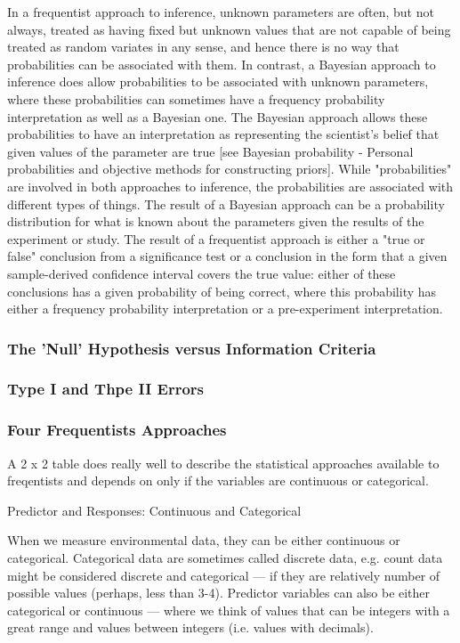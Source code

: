 \documentclass{article}\usepackage[]{graphicx}\usepackage[]{color}
\begin{document}
In a frequentist approach to inference, unknown parameters are often, but not always, treated as having fixed but unknown values that are not capable of being treated as random variates in any sense, and hence there is no way that probabilities can be associated with them. In contrast, a Bayesian approach to inference does allow probabilities to be associated with unknown parameters, where these probabilities can sometimes have a frequency probability interpretation as well as a Bayesian one. The Bayesian approach allows these probabilities to have an interpretation as representing the scientist's belief that given values of the parameter are true [see Bayesian probability - Personal probabilities and objective methods for constructing priors].
While "probabilities" are involved in both approaches to inference, the probabilities are associated with different types of things. The result of a Bayesian approach can be a probability distribution for what is known about the parameters given the results of the experiment or study. The result of a frequentist approach is either a "true or false" conclusion from a significance test or a conclusion in the form that a given sample-derived confidence interval covers the true value: either of these conclusions has a given probability of being correct, where this probability has either a frequency probability interpretation or a pre-experiment interpretation.

\subsubsection{The 'Null' Hypothesis versus Information Criteria}


\subsubsection{Type I and Thpe II Errors}


\subsubsection{Four Frequentists Approaches}

A 2 x 2 table does really well to describe the statistical approaches available to freqentists and depends on only if the variables are continuous or categorical. 

Predictor and Responses: Continuous and Categorical

When we measure environmental data, they can be either continuous or categorical. Categorical data are sometimes called discrete data, e.g. count data might be considered discrete and categorical --- if they are relatively number of possible values (perhaps, less than 3-4). Predictor variables can also be either categorical or continuous --- where we think of values that can be integers with a great range and values between integers (i.e. values with decimals).
\end{document}
